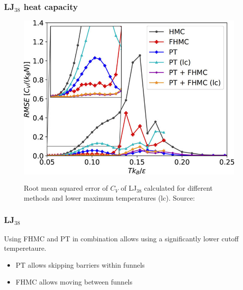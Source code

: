 \documentclass{beamer}
\begin{document}
	\begin{frame}
		\frametitle{LJ$_{38}$ heat capacity}
		\begin{figure}
			\center
			\includegraphics[height=0.8\textheight]{figures/LJ38_rmse.jpeg}
			\label{fig:LJ38_rmse}
			\caption{Root mean squared error of $C_V$ of LJ$_{38}$ calculated for different methods and lower maximum temperatures (lc). Source: \cite{Finkler2020}}
		\end{figure}	
	\end{frame}

	\begin{frame}
		\frametitle{LJ$_{38}$}
		Using FHMC and PT in combination allows using a significantly lower cutoff temperetaure.
		\begin{itemize}
			\item PT allows skipping barriers within funnels
			\item FHMC allows moving between funnels
		\end{itemize}
	\end{frame}
\end{document}
